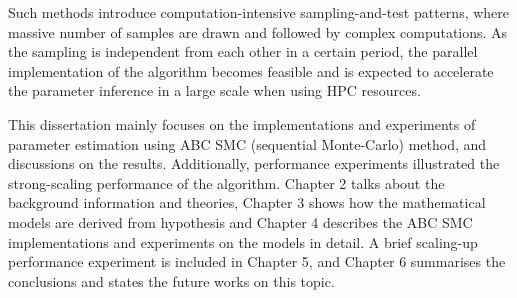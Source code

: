 Such methods introduce computation-intensive sampling-and-test patterns, where massive number of samples are drawn and followed by complex computations. As the sampling is independent from each other in a certain period, the parallel implementation of the algorithm becomes feasible and is expected to accelerate the parameter inference in a large scale when using HPC resources.

This dissertation mainly focuses on the implementations and experiments of parameter estimation using ABC SMC (sequential Monte-Carlo) method, and discussions on the results. Additionally, performance experiments illustrated the strong-scaling performance of the algorithm. Chapter 2 talks about the background information and theories, Chapter 3 shows how the mathematical models are derived from hypothesis and Chapter 4 describes the ABC SMC implementations and experiments on the models in detail. A brief scaling-up performance experiment is included in Chapter 5, and Chapter 6 summarises the conclusions and states the future works on this topic.
